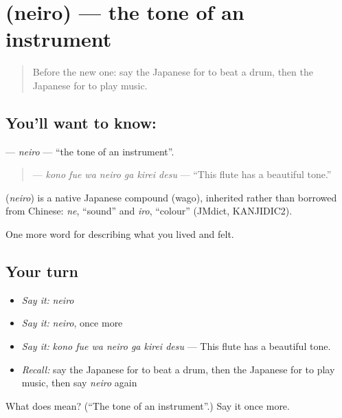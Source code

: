 \section[\texorpdfstring{\ja{ねいろ} (neiro)}{ねいろ (neiro)}]{ (neiro) — the tone of an instrument}

\label{lesson:JA-C469-neiro}



\begin{quote}
Before the new one: say the Japanese for to beat a drum, then the Japanese for to play music.
\end{quote}

\subsection*{You'll want to know: }
\textbf{} — \emph{neiro} — \textquotedblleft{}the tone of an instrument\textquotedblright{}.

\begin{quote}
\textbf{   } — \emph{kono fue wa neiro ga kirei desu} — \textquotedblleft{}This flute has a beautiful tone.\textquotedblright{}
\end{quote}

\begin{cousinweb}
\textbf{} (\emph{neiro}) is a native Japanese compound (wago), inherited rather than borrowed from Chinese: \emph{ne}, \textquotedblleft{}sound\textquotedblright{} and \emph{iro}, \textquotedblleft{}colour\textquotedblright{} (JMdict, KANJIDIC2).
\end{cousinweb}

\begin{grammarlens}[title={What you've built}]
One more word for describing what you lived and felt.
\end{grammarlens}

\subsection*{Your turn}
\begin{itemize}
\raggedright
  \item \emph{Say it:} \emph{neiro}
  \item \emph{Say it:} \emph{neiro}, once more
  \item \emph{Say it:} \emph{kono fue wa neiro ga kirei desu} — This flute has a beautiful tone.
  \item \emph{Recall:} say the Japanese for to beat a drum, then the Japanese for to play music, then say \emph{neiro} again
\end{itemize}

\begin{tcolorbox}[breakable,colback=teal!4,colframe=teal!35!black,title={Before you move on}]
What does  mean? (\textquotedblleft{}The tone of an instrument\textquotedblright{}.) Say it once more.
\end{tcolorbox}
